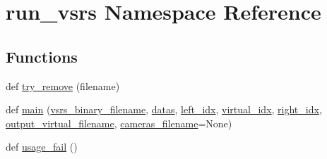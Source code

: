\hypertarget{namespacerun__vsrs}{}\section{run\+\_\+vsrs Namespace Reference}
\label{namespacerun__vsrs}
\subsection*{Functions}
\begin{DoxyCompactItemize}
\item 
def \hyperlink{namespacerun__vsrs_a18673db08912b18a39f042a9d4003107}{try\+\_\+remove} (filename)
\item 
def \hyperlink{namespacerun__vsrs_a244469fbfa38d38b497fe35d9ad8049e}{main} (\hyperlink{namespacerun__vsrs_adf3ba948a5f8384031e8473a315dd950}{vsrs\+\_\+binary\+\_\+filename}, \hyperlink{namespacerun__vsrs_abed6970d28e59cb146251f3a2aa3660b}{datas}, \hyperlink{namespacerun__vsrs_abe5122b51fc6f6d3cbc026cdd89ed0c0}{left\+\_\+idx}, \hyperlink{namespacerun__vsrs_a3980f369a001df8bf6754ee4db9cb31c}{virtual\+\_\+idx}, \hyperlink{namespacerun__vsrs_aed17ae07d2eb1b1bb9be548e43d57cf0}{right\+\_\+idx}, \hyperlink{namespacerun__vsrs_ab202a2d5cb4c68a83ecfc5781f284f16}{output\+\_\+virtual\+\_\+filename}, \hyperlink{namespacerun__vsrs_ae2016f4c5aecea18c3e0b313b26618cd}{cameras\+\_\+filename}=None)
\item 
def \hyperlink{namespacerun__vsrs_a7fe4fad0aa350f5c076e1d53f80c2f1b}{usage\+\_\+fail} ()
\end{DoxyCompactItemize}

